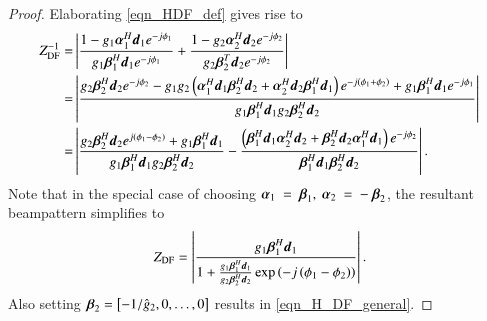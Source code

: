 \begin{proof}
    Elaborating \eqref{eqn_HDF_def} gives rise to
    \fi
    \begin{equation*}
        \centering
        \begin{split}
            Z_{\text{DF}}^{-1}
            =&                    \abs{\frac{1-\gI{1}\vAlphaHI{1}\vdI{1}e^{{-j\phiI{1}}}}{\gI{1}\vBetaHI{1}\vdI{1}e^{{-j\phiI{1}}}} + \frac{1-\gI{2}\vAlphaHI{2}\vdI{2}e^{{-j\phiI{2}}}}{\gI{2}\vBetaTI{2}\vdI{2}e^{{-j\phiI{2}}}}}
            \\
            =&
            \abs{\frac{\gI{2}\vBetaHI{2}\vdI{2}e^{{-j\phiI{2}}}-\gI{1}\gI{2}\rBrace{\vAlphaHI{1}\vdI{1}\vBetaHI{2}\vdI{2}+\vAlphaHI{2}\vdI{2}\vBetaHI{1}\vdI{1}}e^{-j\rBrace{\phiI{1}+\phiI{2}}}+\gI{1}\vBetaHI{1}\vdI{1}e^{{-j\phiI{1}}}}
            {
            \gI{1}\vBetaHI{1}\vdI{1}\gI{2}\vBetaHI{2}\vdI{2}
            }}
            \\
            =&
            \abs{
            \frac
            {                    \gI{2}\vBetaHI{2}\vdI{2}e^{{j\rBrace{\phiI{1}-\phiI{2}}}}+\gI{1}\vBetaHI{1}\vdI{1}
            }{
            \gI{1}\vBetaHI{1}\vdI{1}\gI{2}\vBetaHI{2}\vdI{2}
            }
            -\frac
            {                    \rBrace{\vBetaHI{1}\vdI{1}\vAlphaHI{2}\vdI{2}+\vBetaHI{2}\vdI{2}\vAlphaH_{1}\vdI{1}}e^{{-j\phiI{2}}}
            }{
            \vBetaHI{1}\vdI{1}\vBetaHI{2}\vdI{2}
            }
            }
            .
        \end{split}
    \end{equation*}
    \ifdefined\useOmega
    \fi
    Note that in the special case of choosing $\boldsymbol{\alpha}_{1}~=~\boldsymbol{\beta}_{1},\ \boldsymbol{\alpha}_{2}~=~-~\boldsymbol{\beta}_{2}$, the resultant beampattern simplifies to
    \begin{equation*}
        Z_{\text{DF}} = \left|{\frac{g_{1}\boldsymbol{\beta}^{H}_{1}\boldsymbol{d}_{1}}{1+\frac{g_{1}\boldsymbol{\beta}^{H}_{1}\boldsymbol{d}_{1}}{g_{2}\boldsymbol{\beta}^{H}_{2}\boldsymbol{d}_{2}}\exp{\left({-j\left({\phi_{1}-\phi_{2}}\right)}\right)}}}\right|.
    \end{equation*}
    Also setting
    $\boldsymbol{\beta}_{2}=\left[{-1/\hat{g}_{2},0,\hdots,0}\right]$
    results in \eqref{eqn_H_DF_general}.
\end{proof}